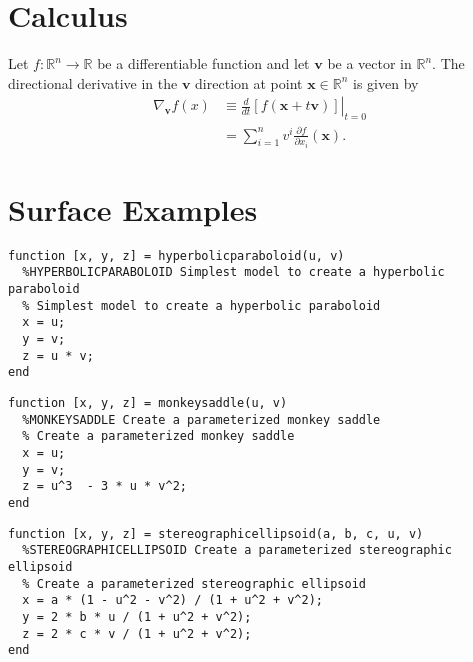 \documentclass{book}
\begin{document}
	\chapter{Calculus}
		Let $f:\mathbb{R}^n\rightarrow\mathbb{R}$ be a differentiable function and let $\mathbf{v}$ be a vector in $\mathbb{R}^n$. The directional derivative in the $\mathbf{v}$ direction at point $\mathbf{x}\in\mathbb{R}^n$ is given by
		\begin{align}
			\nabla_\mathbf{v}f(x)&\equiv\left.\frac{d}{dt}[f(\mathbf{x}+t\mathbf{v})]\right\rvert_{t=0}\\
			&=\sum_{i=1}^{n}{v^i\frac{\partial f}{\partial x_i}(\mathbf{x})}\mathrm{.}
		\end{align}
		
	\chapter{Surface Examples}
	
\begin{small}
\begin{verbatim}
function [x, y, z] = hyperbolicparaboloid(u, v)
  %HYPERBOLICPARABOLOID Simplest model to create a hyperbolic paraboloid
  % Simplest model to create a hyperbolic paraboloid
  x = u;
  y = v;
  z = u * v;
end		
\end{verbatim}		
\end{small}	
	
\begin{small}
\begin{verbatim}
function [x, y, z] = monkeysaddle(u, v)
  %MONKEYSADDLE Create a parameterized monkey saddle
  % Create a parameterized monkey saddle
  x = u;
  y = v;
  z = u^3  - 3 * u * v^2;
end		
\end{verbatim}		
\end{small}

\begin{small}
\begin{verbatim}
function [x, y, z] = stereographicellipsoid(a, b, c, u, v)
  %STEREOGRAPHICELLIPSOID Create a parameterized stereographic ellipsoid
  % Create a parameterized stereographic ellipsoid
  x = a * (1 - u^2 - v^2) / (1 + u^2 + v^2);
  y = 2 * b * u / (1 + u^2 + v^2);
  z = 2 * c * v / (1 + u^2 + v^2);
end	
\end{verbatim}		
\end{small}
		
\end{document}
